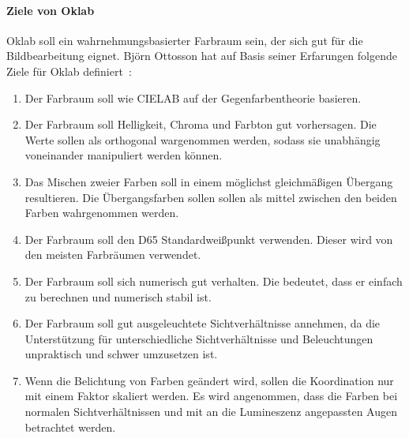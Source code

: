 \documentclass[12pt, a4paper, ngerman]{article}
\begin{document}
\paragraph{Ziele von Oklab}
Oklab soll ein wahrnehmungsbasierter Farbraum sein, der sich gut für die Bildbearbeitung eignet.
Björn Ottosson hat auf Basis seiner Erfarungen folgende Ziele für Oklab definiert~\cite{Oklab_2020}:
\begin{enumerate}
  \item Der Farbraum soll wie CIELAB auf der Gegenfarbentheorie basieren.
  \item Der Farbraum soll Helligkeit, Chroma und Farbton gut vorhersagen. Die Werte sollen als orthogonal wargenommen werden, sodass sie unabhängig voneinander manipuliert werden können.
  \item Das Mischen zweier Farben soll in einem möglichst gleichmäßigen Übergang resultieren. Die Übergangsfarben sollen sollen als mittel zwischen den beiden Farben wahrgenommen werden. 
  \item Der Farbraum soll den D65 Standardweißpunkt verwenden. Dieser wird von den meisten Farbräumen verwendet.
  \item Der Farbraum soll sich numerisch gut verhalten. Die bedeutet, dass er einfach zu berechnen und numerisch stabil ist.
  \item Der Farbraum soll gut ausgeleuchtete Sichtverhältnisse annehmen, da die Unterstützung für unterschiedliche Sichtverhältnisse und Beleuchtungen unpraktisch und schwer umzusetzen ist.
  \item Wenn die Belichtung von Farben geändert wird, sollen die Koordination nur mit einem Faktor skaliert werden. Es wird angenommen, dass die Farben bei normalen Sichtverhältnissen und mit an die Lumineszenz angepassten Augen betrachtet werden.
\end{enumerate}
\end{document}
